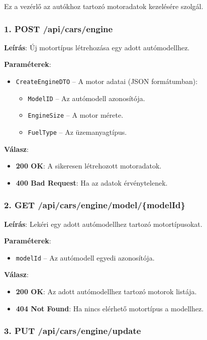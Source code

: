 \documentclass{report}[11pt]
\begin{document}
Ez a vezérlő az autókhoz tartozó motoradatok kezelésére szolgál.

\subsubsection{1. POST /api/cars/engine}

\textbf{Leírás}:  
Új motortípus létrehozása egy adott autómodellhez.

\textbf{Paraméterek}:  
\begin{itemize}
    \item \texttt{CreateEngineDTO} – A motor adatai (JSON formátumban):
    \begin{itemize}
        \item \texttt{ModelID} – Az autómodell azonosítója.
        \item \texttt{EngineSize} – A motor mérete.
        \item \texttt{FuelType} – Az üzemanyagtípus.
    \end{itemize}
\end{itemize}

\textbf{Válasz}:  
\begin{itemize}
    \item \textbf{200 OK}: A sikeresen létrehozott motoradatok.
    \item \textbf{400 Bad Request}: Ha az adatok érvénytelenek.
\end{itemize}

\subsubsection{2. GET /api/cars/engine/model/\{modelId\}}

\textbf{Leírás}:  
Lekéri egy adott autómodellhez tartozó motortípusokat.

\textbf{Paraméterek}:  
\begin{itemize}
    \item \texttt{modelId} – Az autómodell egyedi azonosítója.
\end{itemize}

\textbf{Válasz}:  
\begin{itemize}
    \item \textbf{200 OK}: Az adott autómodellhez tartozó motorok listája.
    \item \textbf{404 Not Found}: Ha nincs elérhető motortípus a modellhez.
\end{itemize}

\subsubsection{3. PUT /api/cars/engine/update}
\end{document}
